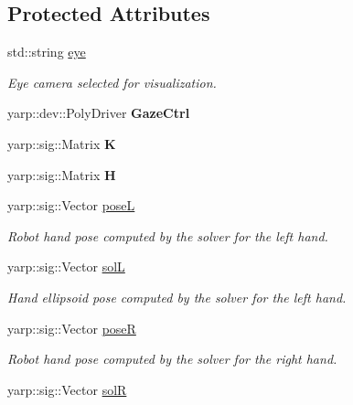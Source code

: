 \subsection*{Protected Attributes}
\begin{DoxyCompactItemize}
\item 
std\+::string \hyperlink{classGraspVisualization_ace61511b9d00f72c39311e6213dc4047}{eye}\label{classGraspVisualization_ace61511b9d00f72c39311e6213dc4047}

\begin{DoxyCompactList}\small\item\em Eye camera selected for visualization. \end{DoxyCompactList}\item 
yarp\+::dev\+::\+Poly\+Driver {\bfseries Gaze\+Ctrl}\label{classGraspVisualization_ad7bdd9a15a2c683a358e77bb694598d2}

\item 
yarp\+::sig\+::\+Matrix {\bfseries K}\label{classGraspVisualization_a36a4e8dd697faf597dcb41d95aac83de}

\item 
yarp\+::sig\+::\+Matrix {\bfseries H}\label{classGraspVisualization_a422df68dee6c62ba04f00677dccae57e}

\item 
yarp\+::sig\+::\+Vector \hyperlink{classGraspVisualization_afe153394fdf1ffd1b70a3396d469188d}{poseL}\label{classGraspVisualization_afe153394fdf1ffd1b70a3396d469188d}

\begin{DoxyCompactList}\small\item\em Robot hand pose computed by the solver for the left hand. \end{DoxyCompactList}\item 
yarp\+::sig\+::\+Vector \hyperlink{classGraspVisualization_a4952ee1be9e70461326b47ef50f064f2}{solL}\label{classGraspVisualization_a4952ee1be9e70461326b47ef50f064f2}

\begin{DoxyCompactList}\small\item\em Hand ellipsoid pose computed by the solver for the left hand. \end{DoxyCompactList}\item 
yarp\+::sig\+::\+Vector \hyperlink{classGraspVisualization_ab78d3c9bb633b704b22244db49b08423}{poseR}\label{classGraspVisualization_ab78d3c9bb633b704b22244db49b08423}

\begin{DoxyCompactList}\small\item\em Robot hand pose computed by the solver for the right hand. \end{DoxyCompactList}\item 
yarp\+::sig\+::\+Vector \hyperlink{classGraspVisualization_a2f2c72e622512ee74014e3715beba78b}{solR}\label{classGraspVisualization_a2f2c72e622512ee74014e3715beba78b}


\end{DoxyCompactItemize}
